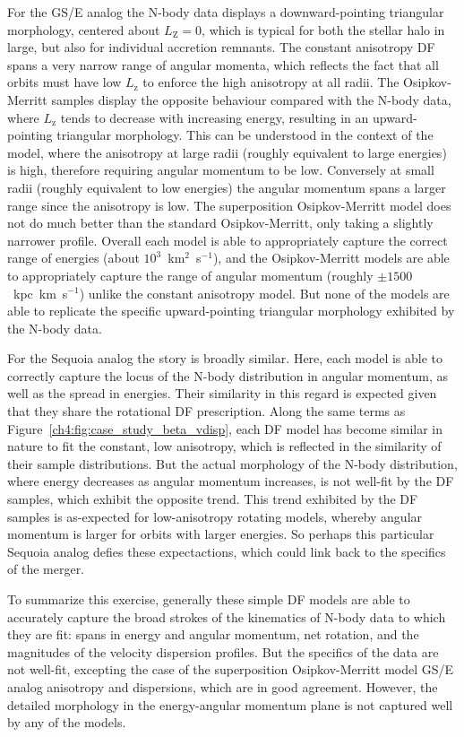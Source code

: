 For the GS/E analog the N-body data displays a downward-pointing triangular morphology, centered about $L_\mathrm{Z}=0$, which is typical for both the stellar halo in large, but also for individual accretion remnants. The constant anisotropy DF spans a very narrow range of angular momenta, which reflects the fact that all orbits must have low $L_\mathrm{z}$ to enforce the high anisotropy at all radii. The Osipkov-Merritt samples display the opposite behaviour compared with the N-body data, where $L_\mathrm{z}$ tends to decrease with increasing energy, resulting in an upward-pointing triangular morphology. This can be understood in the context of the model, where the anisotropy at large radii (roughly equivalent to large energies) is high, therefore requiring angular momentum to be low. Conversely at small radii (roughly equivalent to low energies) the angular momentum spans a larger range since the anisotropy is low. The superposition Osipkov-Merritt model does not do much better than the standard Osipkov-Merritt, only taking a slightly narrower profile. Overall each model is able to appropriately capture the correct range of energies (about $10^{3}$~km$^{2}$~s$^{-1}$), and the Osipkov-Merritt models are able to appropriately capture the range of angular momentum (roughly $\pm 1500$~kpc~km~s$^{-1}$) unlike the constant anisotropy model. But none of the models are able to replicate the specific upward-pointing triangular morphology exhibited by the N-body data.

For the Sequoia analog the story is broadly similar. Here, each model is able to correctly capture the locus of the N-body distribution in angular momentum, as well as the spread in energies. Their similarity in this regard is expected given that they share the rotational DF prescription. Along the same terms as Figure~\ref{ch4:fig:case_study_beta_vdisp}, each DF model has become similar in nature to fit the constant, low anisotropy, which is reflected in the similarity of their sample distributions. But the actual morphology of the N-body distribution, where energy decreases as angular momentum increases, is not well-fit by the DF samples, which exhibit the opposite trend. This trend exhibited by the DF samples is as-expected for low-anisotropy rotating models, whereby angular momentum is larger for orbits with larger energies. So perhaps this particular Sequoia analog defies these expectactions, which could link back to the specifics of the merger.

To summarize this exercise, generally these simple DF models are able to accurately capture the broad strokes of the kinematics of N-body data to which they are fit: spans in energy and angular momentum, net rotation, and the magnitudes of the velocity dispersion profiles. But the specifics of the data are not well-fit, excepting the case of the superposition Osipkov-Merritt model GS/E analog anisotropy and dispersions, which are in good agreement. However, the detailed morphology in the energy-angular momentum plane is not captured well by any of the models.

